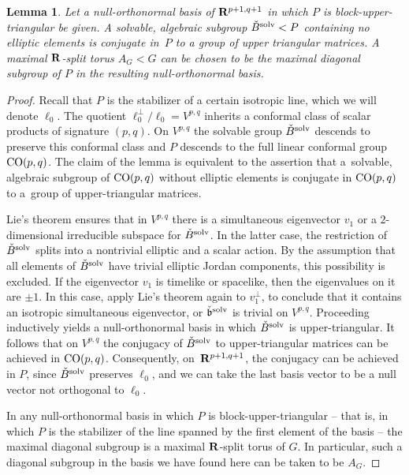 \documentclass[10pt,a4paper]{amsart}
\numberwithin{equation}{section}
\newtheorem{lem}[thm]{Lemma}
\theoremstyle{definition}
\newcommand{\BR}{{\bf R}}
\def\b{{\mathfrak b}}
\begin{document}
\begin{lem}
\label{lem.solvable.in.p}
Let a null-orthonormal basis of $\BR^{p+1,q+1}$ in which $P$ is block-upper-triangular
be given. A solvable, algebraic
subgroup $\check{B}^{\rm solv} < P$ containing no elliptic elements is conjugate in~$P$ to a group of upper triangular matrices.
A maximal $\BR$-split torus $A_G < G$ can be chosen to be the maximal diagonal subgroup of $P$ in the resulting null-orthonormal basis.
\end{lem}

\begin{proof}
Recall that $P$ is the stabilizer of a certain isotropic line, which we will denote $\ell_0$. The quotient $\ell_0^\perp/\ell_0 = V^{p,q}$ inherits a conformal class of
scalar products of signature $(p,q)$. On $V^{p,q}$ the solvable group $\check{B}^{\rm solv}$ descends to preserve this conformal class and $P$ descends to the full linear conformal group ${\rm CO}(p,q)$. The claim of the lemma is equivalent to the assertion that
a~solvable, algebraic subgroup of ${\rm CO}(p,q)$ without elliptic elements is conjugate in ${\rm CO}(p,q)$ to a~group of upper-triangular matrices.


Lie's theorem ensures that in $V^{p,q}$ there is a simultaneous eigenvector $v_1$ or a $2$-dimensional irreducible subspace for $\check{B}^{\rm solv}$. In the latter case, the restriction of $\check{B}^{\rm solv}$ splits into a nontrivial elliptic and a scalar action. By the assumption that all elements of $\check{B}^{\rm solv}$ have trivial elliptic Jordan components, this possibility is excluded. If the eigenvector $v_1$ is timelike or spacelike, then the eigenvalues on it are $\pm 1$. In this case,
apply Lie's theorem again to $v_1^\perp$, to conclude that it contains an isotropic simultaneous eigenvector, or $\check{\b}^{\rm solv}$ is trivial on $V^{p,q}$. Proceeding inductively yields a null-orthonormal basis in which $\check{B}^{\rm solv}$ is upper-triangular. It follows that on $V^{p,q}$ the conjugacy of $\check{B}^{\rm solv}$ to upper-triangular matrices can be achieved in ${\rm CO}(p,q)$. Consequently, on~$\BR^{p+1,q+1}$, the conjugacy can be achieved in $P$, since $\check{B}^{\rm solv}$ preserves $\ell_0$, and we can take the last basis vector to be a null vector not orthogonal to $\ell_0$.

In any null-orthonormal basis in which $P$ is block-upper-triangular -- that is, in which $P$ is the stabilizer of the line spanned by the first element of the basis -- the maximal diagonal subgroup is a maximal $\BR$-split torus of $G$. In particular, such a diagonal subgroup in the basis we have found here can be taken to be $A_G$.
\end{proof}
\end{document}

